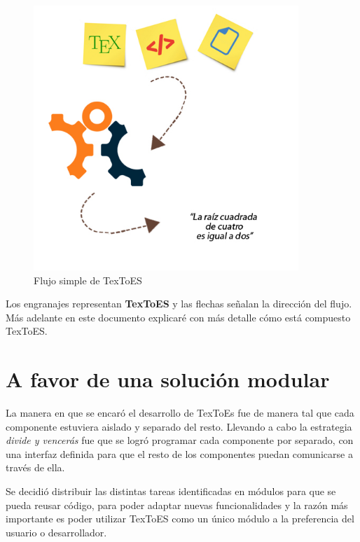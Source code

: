 \begin{figure}[H]
\centering
  \includegraphics[width=10cm, height=10cm]{Figures/arquitectura-general-textoes}
  \caption[]{Flujo simple de TexToES}
\label{fig:arquitectura}
\end{figure}

Los engranajes representan \textbf{TexToES} y las flechas señalan la dirección del flujo. Más adelante en este documento explicaré con más detalle cómo está compuesto TexToES.


\section{A favor de una solución modular}

La manera en que se encaró el desarrollo de TexToEs fue de manera tal que cada componente estuviera aislado y separado del resto.
Llevando a cabo la estrategia \textit{divide y vencerás} fue que se logró programar cada componente por separado, con una interfaz definida para que el resto de los componentes puedan comunicarse a través de ella.

Se decidió distribuir las distintas tareas identificadas en módulos para que se pueda reusar código, para poder adaptar nuevas funcionalidades y la razón más importante es poder utilizar TexToES como un único módulo a la preferencia del usuario o desarrollador.
\\[1cm]

